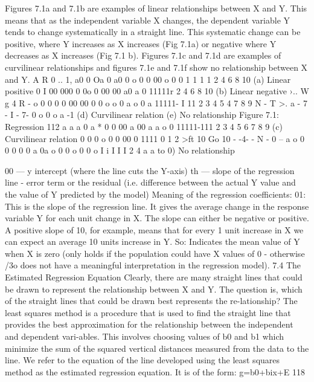 
Figures 7.1a and 7.1b are examples of linear relationships between X and Y. This means that as the independent variable X changes, the dependent variable Y tends to change systematically in a straight line. This systematic change can be positive, where Y increases as X increases (Fig 7.1a) or negative where Y decreases as X increases (Fig 7.1 b). Figures 7.1c and 7.1d are examples of curvilinear relationships and figures 7.1e and 7.1f show no relationship between X and Y. 
A 
R 
0 .. 1, 
a0 
0 
Oa 0 
a0 
0 o 
0 
0 
00 o 0 
0 
1 1 1 1 2 4 6 8 10 (a) Linear positive 
0 I 
00 
000 
0 
0o 0 
00 
00 a0 a 
0 
11111r 2 4 6 8 10 (b) Linear negative 
›.. W g 4 R - o 0 0 0 0 00 00 0 0 o o 0 a o 0 a 11111- I 11 2 3 4 5 4 7 8 9 N - T >. a - 7 - I - 7- 0 o 0 o a -1 
(d) Curvilinear relation 
(e) No relationship 
Figure 7.1: Regression 
112 
a a a 
0 a * 0 0 
00 a 00 a a 
o 0 11111-111 2 3 4 5 6 7 8 9 (c) Curvilinear relation 
0 0 0 o 0 0 00 0 1111 0 1 2 >ft 10 Go 10 - -4- - N - 0 -- a o 0 0 0 0 0 a 0a o 0 0 o 0 0 o I i I I I 2 4 a a to 
0) No relationship 


00 — y intercept (where the line cuts the Y-axis) th — slope of the regression line - error term or the residual (i.e. difference between the actual Y value and the value of Y predicted by the model) 
Meaning of the regression coefficients: 01: This is the slope of the regression line. It gives the average change in the response variable Y for each unit change in X. The slope can either be negative or positive. A positive slope of 10, for example, means that for every 1 unit increase in X we can expect an average 10 units increase in Y. 
So: Indicates the mean value of Y when X is zero (only holds if the population could have X 
values of 0 - otherwise /3o does not have a meaningful interpretation in the regression model). 
7.4 The Estimated Regression Equation 
Clearly, there are many straight lines that could be drawn to represent the relationship between X and Y. The question is, which of the straight lines that could be drawn best represents the re-lationship? The least squares method is a procedure that is used to find the straight line that provides the best approximation for the relationship between the independent and dependent vari-ables. This involves choosing values of b0 and b1 which minimize the sum of the squared vertical distances measured from the data to the line. We refer to the equation of the line developed using the least squares method as the estimated regression equation. It is of the form: 
g=b0+bix+E 
118 


